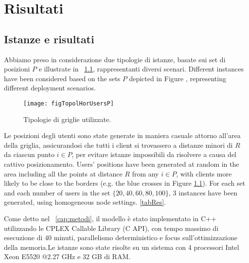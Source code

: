  \chapter{Risultati} \label{chap:risultati}

\ifpdf
    \graphicspath{{Chapter7/Figs/Raster/}{Chapter7/Figs/PDF/}{Chapter7/Figs/}}
\else
    \graphicspath{{Chapter7/Figs/Vector/}{Chapter7/Figs/}}
\fi



\section{Istanze e risultati}
Abbiamo preso in considerazione due tipologie di istanze, basate sui set di posizioni $P$ e illustrate in \figurename\ \ref{figP}, rappresentanti diversi scenari. 
Different instances have been considered based on the sets $P$ depicted in Figure , representing different deployment scenarios.
%
\begin{figure}
	\begin{center}
		\texttt{[image: figTopolHorUsersP]}
	\end{center}
	\caption{Tipologie di griglie utilizzate.} \label{figP}
\end{figure}
%
Le posizioni degli utenti sono state generate in maniera casuale attorno all'area della griglia, assicurandosi che tutti i client si trovassero a distanze minori di $R$ da ciascun punto $i \in P$, per evitare istanze impossibili da risolvere a causa del cattivo posizionamento. 
Users' positions have been generated at random in the area including all the points at distance $R$ from any $i \in P$, with clients more likely to be close to the borders (e.g. the blue crosses in Figure \ref{figP}). For each set and each number of users in the set $\{20,40,60,80,100\}$, 3 instances have been generated, using homogeneous node settings. \ref{tabRes}.
%

Come detto nel \chaptername\ \ref{cap:metodi}, il modello è stato implementato in C++ utilizzando le CPLEX Callable Library (C API), con tempo massimo di esecuzione di 40 minuti, parallelismo deterministico e focus sull'ottimizzazione della memoria.Le istanze sono state risolte su un sistema con 4 processori Intel Xeon E5520 @2.27 GHz e 32 GB di RAM. \\

